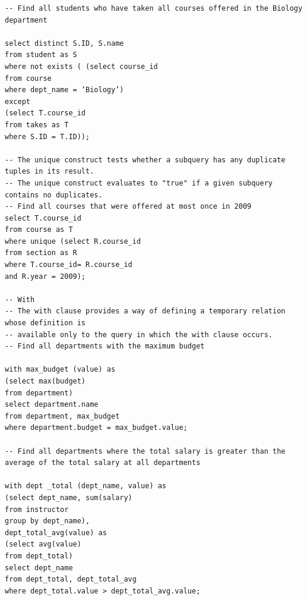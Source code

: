 \documentclass[8pt, a4paper, oneside, twocolumn]{extarticle}
\begin{document}
\begin{verbatim}
-- Find all students who have taken all courses offered in the Biology department

select distinct S.ID, S.name
from student as S
where not exists ( (select course_id
from course
where dept_name = ’Biology’)
except
(select T.course_id
from takes as T
where S.ID = T.ID));

-- The unique construct tests whether a subquery has any duplicate tuples in its result.
-- The unique construct evaluates to "true" if a given subquery contains no duplicates.
-- Find all courses that were offered at most once in 2009
select T.course_id
from course as T
where unique (select R.course_id
from section as R
where T.course_id= R.course_id
and R.year = 2009);

-- With
-- The with clause provides a way of defining a temporary relation whose definition is
-- available only to the query in which the with clause occurs.
-- Find all departments with the maximum budget

with max_budget (value) as
(select max(budget)
from department)
select department.name
from department, max_budget
where department.budget = max_budget.value;

-- Find all departments where the total salary is greater than the average of the total salary at all departments

with dept _total (dept_name, value) as
(select dept_name, sum(salary)
from instructor
group by dept_name),
dept_total_avg(value) as
(select avg(value)
from dept_total)
select dept_name
from dept_total, dept_total_avg
where dept_total.value > dept_total_avg.value;


\end{verbatim}
\end{document}
